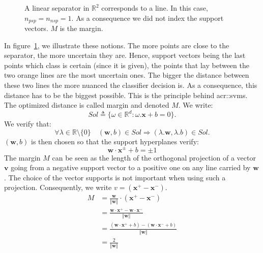             \begin{figure}
				
				\caption{
                    \label{fig::linear_separable} A linear separator in $\mathbb{R}^2$ corresponds to a line.
                    In this case, $n_{psp} = n_{nsp} = 1$.
                    As a consequence we did not index the support vectors.
                    $M$ is the margin.
                }
            \end{figure}

            In figure~\ref{fig::linear_separable}, we illustrate these notions.
            The more points are close to the separator, the more uncertain they are.
            Hence, support vectors being the last points which class is certain (since it is given), the points that lay between the two orange lines are the most uncertain ones.
            The bigger the distance between these two lines the more nuanced the classifier decision is.
            As a consequence, this distance has to be the biggest possible.
            This is the principle behind \glspl{acr::svm}.
            The optimized distance is called margin and denoted $M$.
            We write:
            \begin{equation*}
                Sol \triangleq \{\omega \in \mathbb{R}^d : \omega.\bm{x} + b = 0\}.
            \end{equation*}
            We verify that:
            \begin{equation*}
                \forall \lambda \in \mathbb{R}\setminus\{0\} \quad (\bm{w}, b) \in  Sol \Rightarrow (\lambda . \bm{w}, \lambda.b) \in Sol.
            \end{equation*}
            $(\bm{w}, b)$ is then chosen so that the support hyperplanes verify:
            \begin{equation}
                \label{eq::support_lines}
                \bm{w}\cdot\bm{x}^{\pm} + b = \pm 1
            \end{equation}
            The margin $M$ can be seen as the length of the orthogonal projection of a vector $\bm{v}$ going from a negative support vector to a positive one on any line carried by $\bm{w}$.
            The choice of the vector supports is not important when using such a projection.
            Consequently, we write $v = (\bm{x}^+ - \bm{x}^-)$.
            \begin{align*}
                M &= \frac{\bm{w}}{\Vert\bm{w}\Vert} \cdot (\bm{x}^+ - \bm{x}^-)\\
                  &= \frac{\bm{w}\cdot\bm{x}^+ - \bm{w}\cdot\bm{x}^-}{\Vert\bm{w}\Vert}\\
                  &= \frac{(\bm{w}\cdot\bm{x}^+ + b) - (\bm{w}\cdot\bm{x}^- + b)}{\Vert\bm{w}\Vert}\\
                  &= \frac{2}{\Vert\bm{w}\Vert}
            \end{align*}

